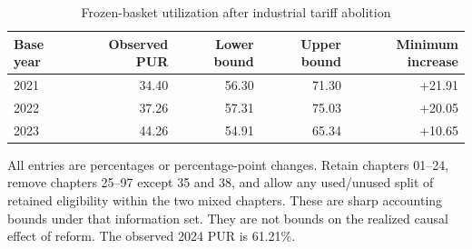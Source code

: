 \begin{table}[!htbp]
\centering
\caption{Frozen-basket utilization after industrial tariff abolition}\label{tab:bounds}
\small
\begin{tabular}{lrrrr}
\toprule
Base year & Observed PUR & Lower bound & Upper bound & Minimum increase \\
\midrule
2021 & 34.40 & 56.30 & 71.30 & +21.91 \\
2022 & 37.26 & 57.31 & 75.03 & +20.05 \\
2023 & 44.26 & 54.91 & 65.34 & +10.65 \\
\bottomrule
\end{tabular}
\par\vspace{3pt}\begin{minipage}{.97\linewidth}\footnotesize All entries are percentages or percentage-point changes. Retain chapters 01--24, remove chapters 25--97 except 35 and 38, and allow any used/unused split of retained eligibility within the two mixed chapters. These are sharp accounting bounds under that information set. They are not bounds on the realized causal effect of reform. The observed 2024 PUR is 61.21\%.\end{minipage}
\end{table}
